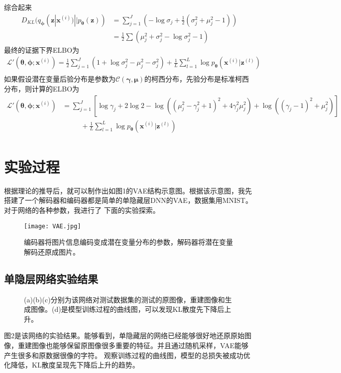 \documentclass[UTF8]{ctexart}
\newcommand*{\bb}[1]{\mathbf{#1}}
\begin{document}
综合起来
\begin{align*}
  D_{KL}(q_{\bm\phi}(\bb z| \bb x^{(i)})||p_{\bm\theta}(\bb z))&=\sum^J_{j=1}\left(-\log\sigma_j+\frac12(\sigma^2_j+\mu^2_j-1)\right)\\
  &=\frac12\sum\left(\mu^2_j+\sigma^2_j-\log\sigma^2_j-1\right)
\end{align*}
最终的证据下界ELBO为
\begin{align*}
  \mathcal{L}'(\bm \theta,\bm \phi;\bb x^{(i)})=\frac12\sum^J_{j=1}\left(1+\log\sigma^2_j-\mu^2_j-\sigma^2_j\right)+\frac 1L\sum^L_{l=1} \log p_{\bm\theta}(\bb x^{(i)}|\bb z^{(l)})\\
\end{align*}
如果假设潜在变量后验分布是参数为$\mathcal{C} \left(\bm\gamma,\bm\mu\right)$的柯西分布，先验分布是标准柯西分布，则计算的ELBO为
\begin{align*}
  \mathcal{L}'(\bm \theta,\bm \phi;\bb x^{(i)})&=\sum^J_{j=1}\left[\log\gamma_j+2\log2-\log\left(\left(\mu^2_j-\gamma^2_j+1\right)^2+4\gamma_j^2\mu_j^2\right)+\log\left(\left(\gamma_j-1\right)^2+\mu^2_j\right)\right]\\
  &\phantom{==}+\frac 1L\sum^L_{l=1} \log p_{\bm\theta}(\bb x^{(i)}|\bb z^{(l)})\\
\end{align*}
\section{实验过程}
根据理论的推导后，就可以制作出如图1的VAE结构示意图。根据该示意图，我先搭建了一个解码器和编码器都是简单的单隐藏层DNN的VAE，数据集用MNIST。对于网络的各种参数，我进行了
下面的实验探索。
\begin{figure}[ht]
  \centering
  \texttt{[image: VAE.jpg]}
  \caption{编码器将图片信息编码变成潜在变量分布的参数，解码器将潜在变量解码还原成图片。}
  \label{fig:VAE}
\end{figure}
\subsection{单隐层网络实验结果}
\begin{figure}[h!]
  \centering
  \quad
  \quad
  \centering
  \caption{(a)(b)(c)分别为该网络对测试数据集的测试的原图像，重建图像和生成图像。(d)是模型训练过程的曲线图，可以发现KL散度先下降后上升。}
\end{figure}
图2是该网络的实验结果。能够看到，单隐藏层的网络已经能够很好地还原原始图像，重建图像也能够保留原图像很多重要的特征。并且通过随机采样，VAE能够产生很多和原数据很像的字符。
观察训练过程的曲线图，模型的总损失被成功优化降低，KL散度呈现先下降后上升的趋势。
\end{document}
